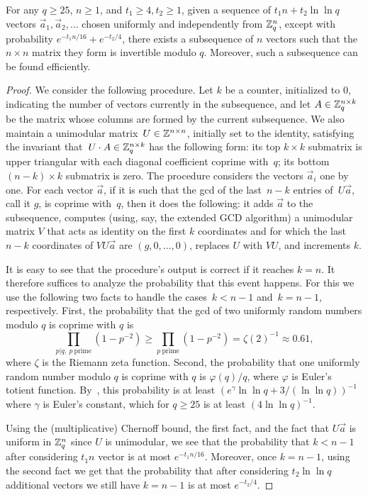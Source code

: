 \begin{claim}\label{clm:invertiblemodq}
For any $q \ge 25$, $n \ge 1$, and $t_1 \ge 4, t_2 \ge 1$, given a sequence of $t_1 n+t_2 \ln\ln q$
vectors $\vec{a}_1,\vec{a}_2,\ldots$ chosen uniformly and independently from $\mathbb{Z}_q^n$,
except with probability $e^{-t_1 n /16} + e^{-t_2/4}$, there exists a subsequence 
of $n$ vectors such that the $n \times n$ matrix they form is invertible modulo $q$. 
Moreover, such a subsequence can be found efficiently. 
\end{claim}
\begin{proof}
We consider the following procedure. 
Let $k$ be a counter, initialized to $0$, indicating the number of vectors currently 
in the subsequence, and let $A \in \mathbb{Z}_q^{n \times k}$ be the matrix whose columns are formed by the current
subsequence. We also maintain a unimodular matrix~$U \in \mathbb{Z}^{n \times n}$, 
initially set to the identity, satisfying the invariant that~$U \cdot A \in \mathbb{Z}_q^{n \times k}$ 
has the following form:
  its top $k \times k$ submatrix is upper triangular with each
  diagonal coefficient coprime with~$q$; its bottom $(n-k) \times
  k$ submatrix is zero.
The procedure considers the vectors $\vec{a}_i$ one by one.
For each vector $\vec{a}$, if it is such that the gcd of the last~$n-k$ entries of~$U
  \vec{a}$, call it $g$, is coprime with~$q$, then it does the following:
	it adds $\vec{a}$ to the subsequence, 
	computes (using, say, the extended GCD algorithm) a unimodular matrix $V$ that acts as identity on the first $k$ coordinates 
	and for which the last $n-k$ coordinates of $VU\vec{a}$ are $(g,0,\ldots,0)$,
	replaces $U$ with $VU$, and increments $k$. 

It is easy to see that the procedure's output is correct if it reaches $k=n$.
It therefore suffices to analyze the probability that this event happens. 
For this we use the following two facts to handle the cases~$k<n-1$ and~$k = n-1$, respectively. First, the probability that
the gcd of two uniformly random numbers modulo $q$ is coprime with $q$ is 
\[
\prod_{p|q,~p~\text{prime}} (1-p^{-2}) \ge \prod_{p~\text{prime}} (1-p^{-2}) = \zeta(2)^{-1} \approx 0.61,
\]
where $\zeta$ is the Riemann zeta function. 
Second, the probability that one uniformly random number modulo $q$ is coprime with $q$
is $\varphi(q)/q$, where $\varphi$ is Euler's totient function. By~\cite[Theorem 8.8.7]{BachShallit}, 
this probability is at least $(e^\gamma \ln \ln q + 3/(\ln\ln q))^{-1}$ where $\gamma$ is Euler's constant, which for $q \ge 25$
is at least $(4 \ln \ln q)^{-1}$. 

Using the (multiplicative) Chernoff bound, the first fact, and the fact that $U\vec{a}$ is uniform in $\mathbb{Z}_q^n$ since $U$ is unimodular, we see that the probability that $k < n-1$ after considering $t_1 n$ vector is at most $e^{-t_1 n /16}$. Moreover, once $k=n-1$, using the second fact we get that the probability that after considering $t_2 \ln \ln q$ additional vectors we still have $k=n-1$ is at most $e^{-t_2/4}$.
\end{proof}



